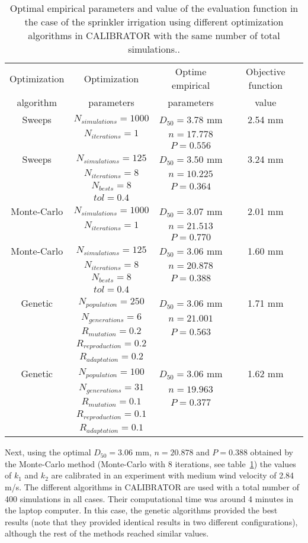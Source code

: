 \documentclass[review,authoryear]{elsarticle}
\newcommand{\TABLE}[5]
{
	\begin{table}[ht!]
		\centering
		\caption{#4.\label{#5}}
		#1
		\begin{tabular}{#2}
			#3
		\end{tabular}
	\end{table}
}
\begin{document}
\TABLE{\scriptsize}{cccc}
{
	Optimization & Optimization & Optime empirical & Objective function
	\\ algorithm & parameters & parameters & value
	\\ \hline
	Sweeps & $N_{simulations}=1000$ & $D_{50}=3.78$ mm & 2.54 mm
	\\ & $N_{iterations}=1$ & $n=17.778$
	\\ & & $P=0.556$
	\\ \hline
	Sweeps & $N_{simulations}=125$ & $D_{50}=3.50$ mm & 3.24 mm
	\\ & $N_{iterations}=8$ & $n=10.225$
	\\ & $N_{bests}=8$ & $P=0.364$
	\\ & $tol=0.4$
	\\ \hline
	Monte-Carlo & $N_{simulations}=1000$ & $D_{50}=3.07$ mm & 2.01 mm
	\\ & $N_{iterations}=1$ & $n=21.513$
	\\ & & $P=0.770$
	\\ \hline
	Monte-Carlo & $N_{simulations}=125$ & $D_{50}=3.06$ mm & 1.60 mm
	\\ & $N_{iterations}=8$ & $n=20.878$
	\\ & $N_{bests}=8$ & $P=0.388$
	\\ & $tol=0.4$
	\\ \hline
	Genetic & $N_{population}=250$ & $D_{50}=3.06$ mm & 1.71 mm
	\\ & $N_{generations}=6$ & $n=21.001$
	\\ & $R_{mutation}=0.2$ & $P=0.563$
	\\ & $R_{reproduction}=0.2$
	\\ & $R_{adaptation}=0.2$
	\\ \hline
	Genetic & $N_{population}=100$ & $D_{50}=3.06$ mm & 1.62 mm
	\\ & $N_{generations}=31$ & $n=19.963$
	\\ & $R_{mutation}=0.1$ & $P=0.377$
	\\ & $R_{reproduction}=0.1$
	\\ & $R_{adaptation}=0.1$
	\\ \hline
}{Optimal empirical parameters and value of the evaluation function in the case of the sprinkler irrigation
using different optimization algorithms in CALIBRATOR with the same number of total simulations.}{TabSprinklerI}

Next, using the optimal $D_{50}=3.06$ mm, $n=20.878$ and $P=0.388$ obtained by the Monte-Carlo method (Monte-Carlo with 8 iterations, see table~\ref{TabSprinklerI}) the values of $k_1$ and $k_2$ are calibrated in an experiment with medium wind velocity of 2.84 m/s. The different algorithms in CALIBRATOR are used with a total number of 400 simulations in all cases. Their computational time was around 4 minutes in the laptop computer. In this case, the genetic algorithms provided the best results  (note that they provided identical results in two different configurations), although the rest of the methods reached similar values.
\end{document}
